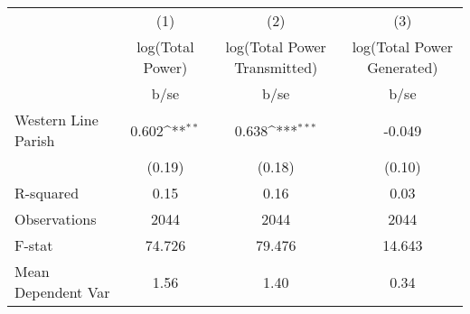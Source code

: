 {
\def\sym#1{\ifmmode^{#1}\else\(^{#1}\)\fi}
\begin{tabular}{l*{3}{c}}
\hline\hline
                    &\multicolumn{1}{c}{(1)}         &\multicolumn{1}{c}{(2)}         &\multicolumn{1}{c}{(3)}         \\
                    &log(Total Power)         &log(Total Power Transmitted)         &log(Total Power Generated)         \\
                    &        b/se         &        b/se         &        b/se         \\
\hline
Western Line Parish &       0.602\sym{**} &       0.638\sym{***}&      -0.049         \\
                    &      (0.19)         &      (0.18)         &      (0.10)         \\
\hline
R-squared           &        0.15         &        0.16         &        0.03         \\
Observations        &        2044         &        2044         &        2044         \\
F-stat              &      74.726         &      79.476         &      14.643         \\
Mean Dependent Var  &        1.56         &        1.40         &        0.34         \\
\hline\hline
\end{tabular}
}
